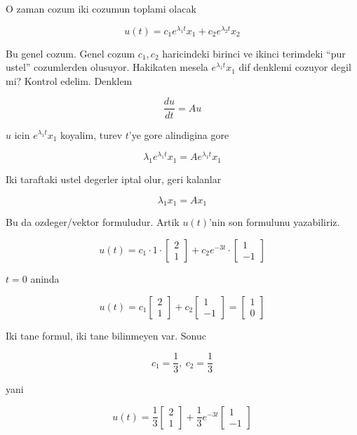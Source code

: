 \documentclass[12pt,fleqn]{article}
\begin{document}
O zaman cozum iki cozumun toplami olacak

\[ u(t) = c_1 e^{\lambda_1 t}x_1 + c_2 e^{\lambda_2 t}x_2\]

Bu genel cozum. Genel cozum $c_1, c_2$ haricindeki birinci ve ikinci
terimdeki ``pur ustel'' cozumlerden olusuyor. Hakikaten mesela $e^{\lambda_1
  t}x_1$ 
dif denklemi cozuyor degil mi? Kontrol edelim. Denklem

\[ \frac{du}{dt} = Au\]

$u$ icin $e^{\lambda_1t}x_1$ koyalim, turev $t$'ye gore alindigina gore

\[ \lambda_1 e^{\lambda_1t}x_1 = A e^{\lambda_1t}x_1\]

Iki taraftaki ustel degerler iptal olur, geri kalanlar

\[ \lambda_1 x_1 = A x_1\]

Bu da ozdeger/vektor formuludur. Artik $u(t)$'nin son formulunu
yazabiliriz. 

\[ u(t) =
c_1 \cdot 1 \cdot 
\left[\begin{array}{c}
2 \\ 1
\end{array}\right]
+
c_2 e^{-3t} \cdot 
\left[\begin{array}{c}
1 \\ -1
\end{array}\right]
 \]

$t=0$ aninda

\[ u(t) =
c_1 
\left[\begin{array}{c}
2 \\ 1
\end{array}\right]
+
c_2 
\left[\begin{array}{c}
1 \\ -1
\end{array}\right] = 
\left[\begin{array}{c}
1 \\ 0
\end{array}\right] 
 \]

Iki tane formul, iki tane bilinmeyen var. Sonuc

\[ c_1 = \frac{1}{3},\ c_2 = \frac{1}{3}\]

yani

\[ u(t) =
\frac{1}{3}
\left[\begin{array}{c}
2 \\ 1
\end{array}\right]
+
\frac{1}{3}  e^{-3t} 
\left[\begin{array}{c}
1 \\ -1
\end{array}\right] 
 \]
\end{document}
